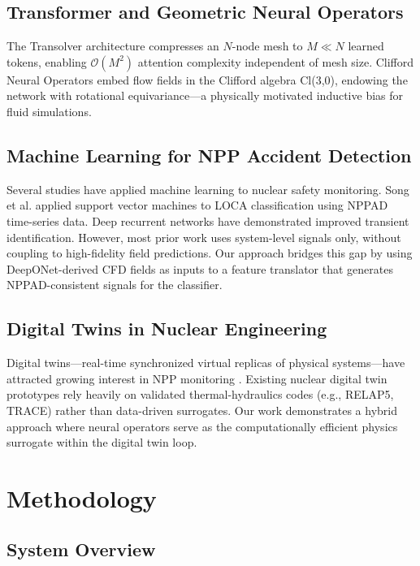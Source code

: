 \documentclass[conference]{IEEEtran}
\begin{document}
\subsection{Transformer and Geometric Neural Operators}
The Transolver architecture \cite{wu2024transolver} compresses an $N$-node mesh to $M \ll N$ learned tokens, enabling $\mathcal{O}(M^2)$ attention complexity independent of mesh size. Clifford Neural Operators \cite{brandstetter2023clifford} embed flow fields in the Clifford algebra Cl(3,0), endowing the network with rotational equivariance—a physically motivated inductive bias for fluid simulations.

\subsection{Machine Learning for NPP Accident Detection}
Several studies have applied machine learning to nuclear safety monitoring. Song et al. \cite{song2018} applied support vector machines to LOCA classification using NPPAD time-series data. Deep recurrent networks \cite{choi2019} have demonstrated improved transient identification. However, most prior work uses system-level signals only, without coupling to high-fidelity field predictions. Our approach bridges this gap by using DeepONet-derived CFD fields as inputs to a feature translator that generates NPPAD-consistent signals for the classifier.

\subsection{Digital Twins in Nuclear Engineering}
Digital twins—real-time synchronized virtual replicas of physical systems—have attracted growing interest in NPP monitoring \cite{grieves2014, liu2022npp}. Existing nuclear digital twin prototypes rely heavily on validated thermal-hydraulics codes (e.g., RELAP5, TRACE) rather than data-driven surrogates. Our work demonstrates a hybrid approach where neural operators serve as the computationally efficient physics surrogate within the digital twin loop.

\section{Methodology}
\label{sec:method}

\subsection{System Overview}
\end{document}
